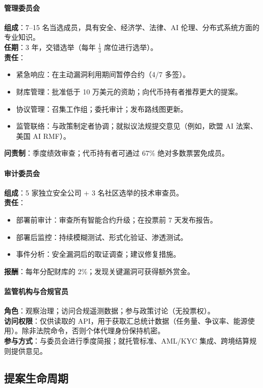 \documentclass[11pt]{article}
\begin{document}
\paragraph{管理委员会}
\textbf{组成}：7--15 名当选成员，具有安全、经济学、法律、AI 伦理、分布式系统方面的专业知识。\\
\textbf{任期}：3 年，交错选举（每年 $\frac{1}{3}$ 席位进行选举）。\\
\textbf{责任}：
\begin{itemize}[noitemsep]
  \item 紧急响应：在主动漏洞利用期间暂停合约（4/7 多签）。
  \item 财库管理：批准低于 10 万美元的资助；向代币持有者推荐更大的提案。
  \item 协议管理：召集工作组；委托审计；发布路线图更新。
  \item 监管联络：与政策制定者协调；就拟议法规提交意见（例如，欧盟 AI 法案、美国 AI RMF）。
\end{itemize}
\textbf{问责制}：季度绩效审查；代币持有者可通过 67\% 绝对多数票罢免成员。

\paragraph{审计委员会}
\textbf{组成}：5 家独立安全公司 + 3 名社区选举的技术审查员。\\
\textbf{责任}：
\begin{itemize}[noitemsep]
  \item 部署前审计：审查所有智能合约升级；在投票前 7 天发布报告。
  \item 部署后监控：持续模糊测试、形式化验证、渗透测试。
  \item 事件分析：安全漏洞后的取证调查；建议修复措施。
\end{itemize}
\textbf{报酬}：每年分配财库的 2\%；发现关键漏洞可获得额外赏金。

\paragraph{监管机构与合规官员}
\textbf{角色}：观察治理；访问合规遥测数据；参与政策讨论（无投票权）。\\
\textbf{访问权限}：仅供读取的 API，用于获取汇总统计数据（任务量、争议率、能源使用）。除非法院命令，否则个体代理身份保持机密。\\
\textbf{参与方式}：与委员会进行季度简报；就托管标准、AML/KYC 集成、跨境结算规则提供意见。

\subsection{提案生命周期}
\end{document}
